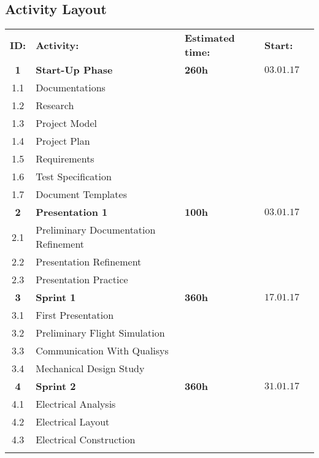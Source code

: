 \begin{center}
\section*{\textbf{Activity Layout}}
\begin{tabular}{cllll}
\rowcolor{cadetgrey}
\textbf{ID:}    &\textbf{Activity:} 	 &\textbf{Estimated time:}    &\textbf{Start:}  \\ %
    
\textbf{1} & \textbf{Start-Up Phase} & \textbf{260h} & $03.01.17$ 
\\\rowcolor{gainsboro}
1.1       & Documentations     &     &  \\
1.2       & Research     &     &  \\\rowcolor{gainsboro}
1.3       & Project Model     &     & \\
1.4       & Project Plan     &     & 
\\\rowcolor{gainsboro}
1.5       & Requirements     &     & \\
1.6       & Test Specification     &     & 
\\\rowcolor{gainsboro}
1.7       & Document Templates     &    & \\
\textbf{2} & \textbf{Presentation 1}     & \textbf{100h}    & $03.01.17$ 
\\\rowcolor{gainsboro}
2.1     & Preliminary Documentation Refinement  &    & \\
2.2     & Presentation Refinement  &    &
\\\rowcolor{gainsboro}
2.3     & Presentation Practice  &    & \\
\textbf{3} & \textbf{Sprint 1}     & \textbf{360h}     & $17.01.17$ 
\\\rowcolor{gainsboro}
3.1     & First Presentation &  & \\
3.2     & Preliminary Flight Simulation &  & \\\rowcolor{gainsboro}
3.3     & Communication With Qualisys &  & \\
3.4     & Mechanical Design Study &  & 
\\\rowcolor{gainsboro}
\textbf{4} & \textbf{Sprint 2}     & \textbf{360h}     & $31.01.17$ \\
4.1     & Electrical Analysis &  &  \\\rowcolor{gainsboro}
4.2     & Electrical Layout &  & \\
4.3     & Electrical Construction & & \\ \rowcolor{gainsboro}

\end{tabular}
\end{center}
